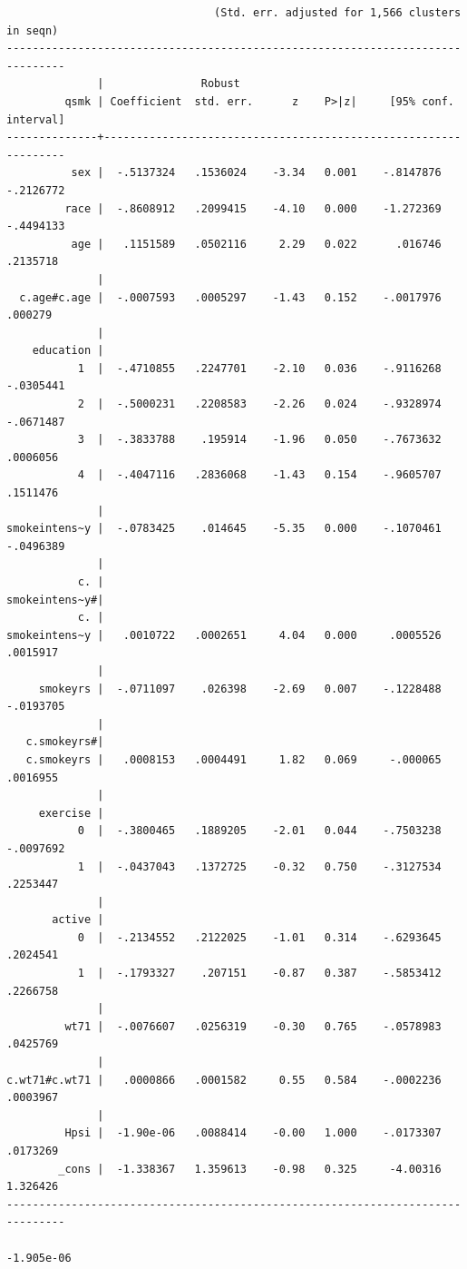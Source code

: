 \documentclass[
  10pt,
]{book}
\begin{document}
\begin{verbatim}
                                (Std. err. adjusted for 1,566 clusters in seqn)
-------------------------------------------------------------------------------
              |               Robust
         qsmk | Coefficient  std. err.      z    P>|z|     [95% conf. interval]
--------------+----------------------------------------------------------------
          sex |  -.5137324   .1536024    -3.34   0.001    -.8147876   -.2126772
         race |  -.8608912   .2099415    -4.10   0.000    -1.272369   -.4494133
          age |   .1151589   .0502116     2.29   0.022      .016746    .2135718
              |
  c.age#c.age |  -.0007593   .0005297    -1.43   0.152    -.0017976     .000279
              |
    education |
           1  |  -.4710855   .2247701    -2.10   0.036    -.9116268   -.0305441
           2  |  -.5000231   .2208583    -2.26   0.024    -.9328974   -.0671487
           3  |  -.3833788    .195914    -1.96   0.050    -.7673632    .0006056
           4  |  -.4047116   .2836068    -1.43   0.154    -.9605707    .1511476
              |
smokeintens~y |  -.0783425    .014645    -5.35   0.000    -.1070461   -.0496389
              |
           c. |
smokeintens~y#|
           c. |
smokeintens~y |   .0010722   .0002651     4.04   0.000     .0005526    .0015917
              |
     smokeyrs |  -.0711097    .026398    -2.69   0.007    -.1228488   -.0193705
              |
   c.smokeyrs#|
   c.smokeyrs |   .0008153   .0004491     1.82   0.069     -.000065    .0016955
              |
     exercise |
           0  |  -.3800465   .1889205    -2.01   0.044    -.7503238   -.0097692
           1  |  -.0437043   .1372725    -0.32   0.750    -.3127534    .2253447
              |
       active |
           0  |  -.2134552   .2122025    -1.01   0.314    -.6293645    .2024541
           1  |  -.1793327    .207151    -0.87   0.387    -.5853412    .2266758
              |
         wt71 |  -.0076607   .0256319    -0.30   0.765    -.0578983    .0425769
              |
c.wt71#c.wt71 |   .0000866   .0001582     0.55   0.584    -.0002236    .0003967
              |
         Hpsi |  -1.90e-06   .0088414    -0.00   1.000    -.0173307    .0173269
        _cons |  -1.338367   1.359613    -0.98   0.325     -4.00316    1.326426
-------------------------------------------------------------------------------

-1.905e-06











\end{verbatim}
\end{document}

